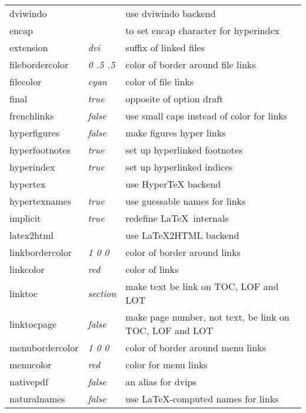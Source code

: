 \documentclass[pdftex]{article}
\begin{document}
\begin{longtable}{@{}>{\ttfamily}llp{7cm}@{}}
dviwindo           &                        & use \textsf{dviwindo} backend \\
encap              &                        & to set encap character for hyperindex \\
extension          & \textit{dvi}           & suffix of linked files \\
filebordercolor    & \textit{0 .5 .5}       & color of border around file links \\
filecolor          & \textit{cyan}          & color of file links \\
final              & \textit{true}          & opposite of option draft \\
frenchlinks        & \textit{false}         & use small caps instead of color for links \\
hyperfigures       & \textit{false}         & make figures hyper links \\
hyperfootnotes     & \textit{true}          & set up hyperlinked footnotes \\
hyperindex         & \textit{true}          & set up hyperlinked indices \\
hypertex           &                        & use \textsf{Hyper\TeX} backend \\
hypertexnames      & \textit{true}          & use guessable names for links \\
implicit           & \textit{true}          & redefine \LaTeX\ internals \\
latex2html         &                        & use \textsf{\LaTeX2HTML} backend \\
linkbordercolor    & \textit{1 0 0}         & color of border around links \\
linkcolor          & \textit{red}           & color of links \\
linktoc            & \textit{section}       & make text be link on TOC, LOF and LOT \\
linktocpage        & \textit{false}         & make page number, not text, be link on TOC, LOF and LOT \\
menubordercolor    & \textit{1 0 0}         & color of border around menu links \\
menucolor          & \textit{red}           & color for menu links \\
nativepdf          & \textit{false}         & an alias for \textsf{dvips} \\
naturalnames       & \textit{false}         & use \LaTeX-computed names for links \\

\end{longtable}
\end{document}
